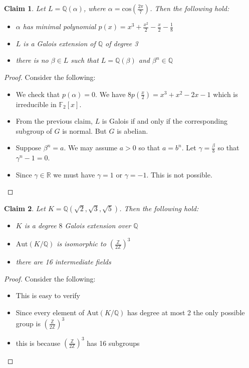 \documentclass{article}
\newtheorem{claim}{Claim}
\begin{document}
\begin{claim}
  Let $L=\mathbb{Q}(\alpha)$, where $\alpha = \text{cos}(\frac{2\pi}{7})$. Then the following hold:
  \begin{itemize}
    \item $\alpha$ has minimal polynomial $p(x)=x^3 + \frac{x^2}{2} -\frac{x}{2} - \frac{1}{8}$
    \item $L$ is a Galois extension of $\mathbb{Q}$ of degree 3
    \item there is no $\beta \in L$ such that $L=\mathbb{Q}(\beta)$ and $\beta^n \in \mathbb{Q}$
  \end{itemize}
\end{claim}

\begin{proof}
  Consider the following:
  \begin{itemize}
    \item We check that $p(\alpha)=0$. We have $8p(\frac{x}{2})=x^3+x^2-2x-1$ which is irreducible in $\mathbb{F}_2[x]$.
    \item From the previous claim, $L$ is Galois if and only if the corresponding subgroup of $G$ is normal. But $G$ is abelian.
    \item Suppose $\beta^n = a$. We may assume $a>0$ so that $a=b^n$. Let $\gamma=\frac{\beta}{b}$ so that $\gamma^n-1=0$.
    \item Since $\gamma \in \mathbb{R}$ we must have $\gamma=1$ or $\gamma=-1$. This is not possible.
  \end{itemize}
\end{proof}

\begin{claim}
  Let $K=\mathbb{Q}(\sqrt{2},\sqrt{3},\sqrt{5})$. Then the following hold:
  \begin{itemize}
    \item $K$ is a degree $8$ Galois extension over $\mathbb{Q}$
    \item $\text{Aut}(K/\mathbb{Q})$ is isomorphic to $(\frac{\mathbb{Z}}{2\mathbb{Z}})^3$
    \item there are 16 intermediate fields
  \end{itemize}
\end{claim}

\begin{proof}
  Consider the following:
  \begin{itemize}
    \item This is easy to verify
    \item Since every element of $\text{Aut}(K/\mathbb{Q})$ has degree at most 2 the only possible group is $(\frac{\mathbb{Z}}{2\mathbb{Z}})^3$
    \item this is because $(\frac{\mathbb{Z}}{2\mathbb{Z}})^3$ has 16 subgroups
  \end{itemize}
\end{proof}
\end{document}
